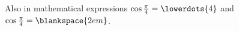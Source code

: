 Also in mathematical expressions
$\cos\frac\pi4 = \lowerdots{4}$
and $\cos\frac\pi4 = \blankspace{2em}$.